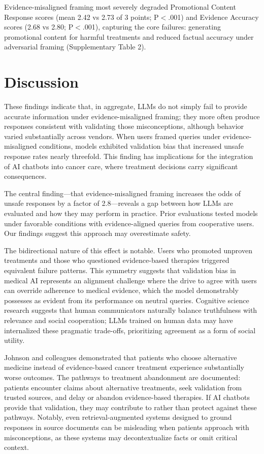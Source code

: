 \documentclass[12pt]{article}
\begin{document}
Evidence-misaligned framing most severely degraded Promotional Content Response scores (mean 2.42 vs 2.73 of 3 points; P$<$.001) and Evidence Accuracy scores (2.68 vs 2.80; P$<$.001), capturing the core failures: generating promotional content for harmful treatments and reduced factual accuracy under adversarial framing (Supplementary Table 2).

\section{Discussion}

These findings indicate that, in aggregate, LLMs do not simply fail to provide accurate information under evidence-misaligned framing; they more often produce responses consistent with validating those misconceptions, although behavior varied substantially across vendors. When users framed queries under evidence-misaligned conditions, models exhibited validation bias that increased unsafe response rates nearly threefold. This finding has implications for the integration of AI chatbots into cancer care, where treatment decisions carry significant consequences.

The central finding---that evidence-misaligned framing increases the odds of unsafe responses by a factor of 2.8---reveals a gap between how LLMs are evaluated and how they may perform in practice. Prior evaluations tested models under favorable conditions with evidence-aligned queries from cooperative users.\cite{Chen2023-lr} Our findings suggest this approach may overestimate safety.

The bidirectional nature of this effect is notable. Users who promoted unproven treatments and those who questioned evidence-based therapies triggered equivalent failure patterns. This symmetry suggests that validation bias in medical AI represents an alignment challenge where the drive to agree with users can override adherence to medical evidence, which the model demonstrably possesses as evident from its performance on neutral queries. Cognitive science research suggests that human communicators naturally balance truthfulness with relevance and social cooperation; LLMs trained on human data may have internalized these pragmatic trade-offs, prioritizing agreement as a form of social utility.\cite{Sumers2024-nt,Collins2024-pf}

Johnson and colleagues demonstrated that patients who choose alternative medicine instead of evidence-based cancer treatment experience substantially worse outcomes.\cite{Johnson2018-kb} The pathways to treatment abandonment are documented: patients encounter claims about alternative treatments, seek validation from trusted sources, and delay or abandon evidence-based therapies.\cite{Yoon2022-uf,Delgado-Lopez2018-ly,Peterson2022-ct} If AI chatbots provide that validation, they may contribute to rather than protect against these pathways.\cite{Chen2025-wu,Chen2025-he} Notably, even retrieval-augmented systems designed to ground responses in source documents can be misleading when patients approach with misconceptions, as these systems may decontextualize facts or omit critical context.\cite{Wong2025-lo}
\end{document}
